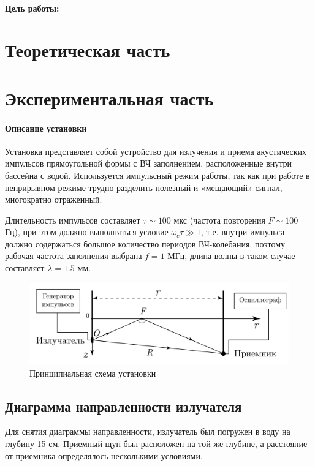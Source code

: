 

\def\labauthors{Виноградов И.Д., Шиков А.П.}
\def\labgroup{440}
\def\labnumber{1}
\def\labtheme{Исследование акустического поля в однородной среде с плоской границей}
\def\department{Кафедра акустики}
\newcommand{\D}[1]{D\qty[#1]}


\paragraph{Цель работы:}

\section{Теоретическая часть}

\newpage
\section{Экспериментальная часть}
\paragraph{Описание установки}
Установка представляет собой устройство для излучения и приема акустических импульсов прямоугольной формы с ВЧ
заполнением, расположенные внутри бассейна с водой. Используется импульсный режим работы, так как при работе в
неприрывном режиме трудно разделить полезный и «мещающий» сигнал, многократно отраженный.

Длительность импульсов составляет $\tau \sim 100$ мкс (частота повторения $F\sim 100$ Гц), при этом должно
выполняться условие $\omega_c \tau \gg 1$, т.е. внутри импульса должно содержаться большое количество периодов
ВЧ-колебания, поэтому рабочая частота заполнения выбрана $f = 1$ МГц, длина волны в таком случае составляет $\lambda = 1.5$ мм.
\begin{figure}[h!]
	\centering
	\includegraphics[width =0.7\linewidth]{fig/scheme0.pdf}
	\caption{Принципиальная схема установки}

\end{figure}
\subsection{Диаграмма направленности излучателя}
Для снятия диаграммы направленности, излучатель был погружен в воду на глубину 15 см. Приемный щуп был расположен на той
же глубине, а расстояние от приемника определялось несколькими условиями.

